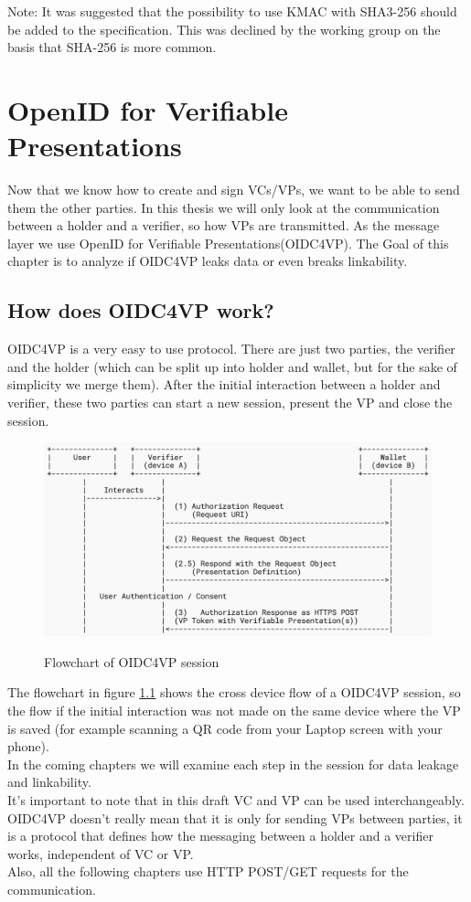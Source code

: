 \documentclass[
	a4paper               %
	,BCOR=0mm            %
	,bibliography=totoc   %
	,listof=totoc         %
	,monolingual
	,twoside=false
]{bfhthesis}              %
\begin{document}
Note: It was suggested that the possibility to use KMAC with SHA3-256 should be added to the specification. This was declined by the working group on the basis that SHA-256 is more common.

\chapter{OpenID for Verifiable Presentations}
Now that we know how to create and sign VCs/VPs, we want to be able to send them the other parties.
In this thesis we will only look at the communication between a holder and a verifier, so how VPs are transmitted.
As the message layer we use OpenID for Verifiable Presentations(OIDC4VP)\cite{oidc4vp}.
The Goal of this chapter is to analyze if OIDC4VP leaks data or even breaks linkability.

\section{How does OIDC4VP work?}
OIDC4VP is a very easy to use protocol.
There are just two parties, the verifier and the holder (which can be split up into holder and wallet, but for the sake of simplicity we merge them).
After the initial interaction between a holder and verifier, these two parties can start a new session, present the VP and close the session.

\begin{figure}[h]
	\centering
	\includegraphics[width=12cm]{./img/oidc4vpflow.png}
	\label{fig:flowvp}
	\caption{Flowchart of OIDC4VP session}
\end{figure}

The flowchart in figure \ref{fig:flowvp} shows the cross device flow of a OIDC4VP session, so the flow if the initial interaction was not made on the same device where the VP is saved (for example scanning a QR code from your Laptop screen with your phone).\\
In the coming chapters we will examine each step in the session for data leakage and linkability.\\
It's important to note that in this draft VC and VP can be used interchangeably.
OIDC4VP doesn't really mean that it is only for sending VPs between parties, it is a protocol that defines how the messaging between a holder and a verifier works, independent of VC or VP.\\
Also, all the following chapters use HTTP POST/GET requests for the communication.
\end{document}
